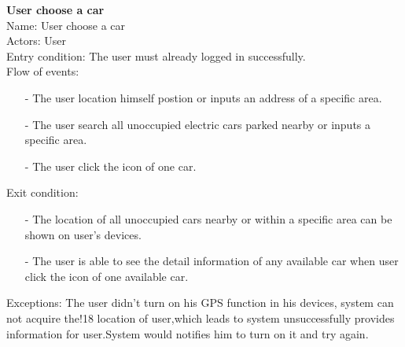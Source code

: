 \documentclass[12pt, letterpaper]{article}
\begin{document}
\textbf{User choose a car} \\
Name: User choose a car \\
Actors: User \\
Entry condition: The user must already logged in successfully. \\
Flow of events: \\
\begin{itemize}
	\item[-] The user location himself postion or inputs an address of a specific area.
	\item[-] The user search all unoccupied electric cars parked nearby or inputs a specific area.
	\item[-] The user click the icon of one car.
\end{itemize} 
Exit condition: \\
\begin{itemize}
	\item[-] The location of all unoccupied cars nearby or within a specific area can be shown on
	user’s devices.
	\item[-] The user is able to see the detail information of any available car when user click the icon
	of one available car.
\end{itemize} 
Exceptions: The user didn’t turn on his GPS function in his devices, system can not acquire the!18
location of user,which leads to system unsuccessfully provides information for user.System
would notifies him to turn on it and try again. \\
\vspace{0.5cm}
\end{document}
